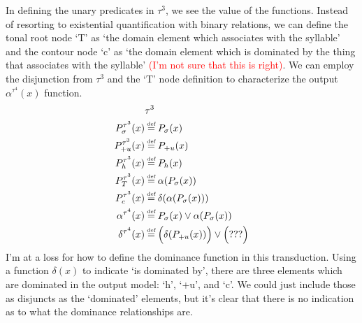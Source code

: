 \documentclass{article}
\newcommand\myeq{\mathrel{\stackrel{\makebox[0pt]{\mbox{\normalfont\tiny def}}}{=}}}
\begin{document}
In defining the unary predicates in $\tau^3$, we see the value of the functions. Instead of resorting to existential quantification with binary relations, we can define the tonal root node `T' as `the domain element which associates with the syllable' and the contour node `c' as `the domain element which is dominated by the thing that associates with the syllable' \textcolor{red}{(I'm not sure that this is right)}. We can employ the disjunction from $\tau^3$ and the `T' node definition to characterize the output $\alpha^{\tau^4}(x)$ function.
\begin{equation}
\begin{split}
&\tau^3 \\
P^{\tau^3}_{\sigma}(x) &\myeq P_{\sigma}(x) \\
P^{\tau^3}_{+u}(x) &\myeq P_{+u}(x) \\
P^{\tau^3}_{h}(x) &\myeq P_{h}(x) \\
P^{\tau^3}_{T}(x) &\myeq \alpha(P_{\sigma}(x)) \\
P^{\tau^3}_{c}(x) &\myeq \delta(\alpha(P_{\sigma}(x))) \\
\alpha^{\tau^4}(x) &\myeq P_{\sigma}(x) \lor \alpha(P_{\sigma}(x)) \\
\delta^{\tau^4}(x) &\myeq \Big(\delta(P_{+u}(x))\Big)\lor\Big(???\Big)\\ 
\end{split}
\end{equation}
I'm at a loss for how to define the dominance function in this transduction. Using a function $\delta(x)$ to indicate `is dominated by', there are three elements which are dominated in the output model: `h', `+u', and `c'. We could just include those as disjuncts as the `dominated' elements, but it's clear that there is no indication as to what the dominance relationships are.  
\end{document}

